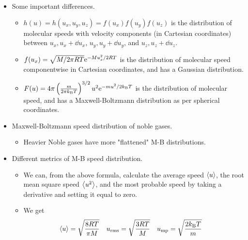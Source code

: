 \documentclass[../notes.tex]{subfiles}
\begin{document}
\begin{itemize}
\begin{itemize}
    \end{itemize}
    \item Some important differences.
    \begin{itemize}
        \item $h(u)=h(u_x,u_y,u_z)=f(u_x)f(u_y)f(u_z)$ is the distribution of molecular speeds with velocity components (in Cartesian coordinates) between $u_x,u_x+\dd{u_x}$, $u_y,u_y+\dd{u_y}$, and $u_z,u_z+\dd{u_z}$.
        \item $f(u_x)=\sqrt{M/2\pi RT}\e[-Mu_x^2/2RT]$ is the distribution of molecular speed componentwise in Cartesian coordinates, and has a Gaussian distribution.
        \item $F(u)=4\pi\left( \frac{m}{2\pi\kB T} \right)^{3/2}u^2\e[-mu^2/2\kB T]$ is the distribution of molecular speed, and has a Maxwell-Boltzmann distribution as per spherical coordinates.
    \end{itemize}
    \item Maxwell-Boltzmann speed distribution of noble gases.
    \begin{itemize}
        \item Heavier Noble gases have more "flattened" M-B distributions.
    \end{itemize}
    \item Different metrics of M-B speed distribution.
    \begin{itemize}
        \item We can, from the above formula, calculate the average speed $\prb{u}$, the root mean square speed $\prb{u^2}$, and the most probable speed by taking a derivative and setting it equal to zero.
        \item We get
        \begin{align*}
            \prb{u} &= \sqrt{\frac{8RT}{\pi M}}&
            u_\text{rms} &= \sqrt{\frac{3RT}{M}}&
            u_\text{mp} &= \sqrt{\frac{2\kB T}{m}}
        \end{align*}
    \end{itemize}
\end{itemize}
\end{document}
